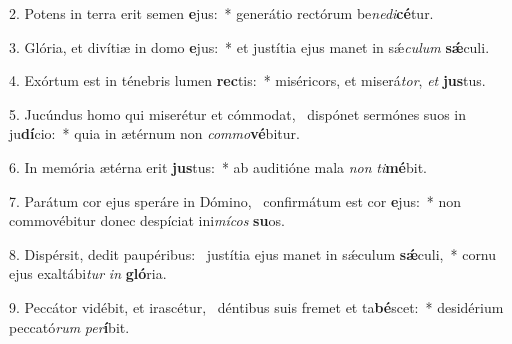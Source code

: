 2. Potens in terra erit semen \textbf{e}jus:~*  generátio rectórum be\textit{ne}\textit{di}\textbf{cé}tur.\

3. Glória, et divítiæ in domo \textbf{e}jus:~*  et justítia ejus manet in sǽ\textit{cu}\textit{lum} \textbf{sǽ}culi.\

4. Exórtum est in ténebris lumen \textbf{rec}tis:~*  miséricors, et miserá\textit{tor}, \textit{et} \textbf{jus}tus.\

5. Jucúndus homo qui miserétur et cómmodat, \dag\  dispónet sermónes suos in ju\textbf{dí}cio:~*  quia in ætérnum non \textit{com}\textit{mo}\textbf{vé}bitur.\

6. In memória ætérna erit \textbf{jus}tus:~*  ab auditióne mala \textit{non} \textit{ti}\textbf{mé}bit.\

7. Parátum cor ejus speráre in Dómino, \dag\  confirmátum est cor \textbf{e}jus:~*  non commovébitur donec despíciat ini\textit{mí}\textit{cos} \textbf{su}os.\

8. Dispérsit, dedit paupéribus: \dag\  justítia ejus manet in sǽculum \textbf{sǽ}culi,~*  cornu ejus exaltábi\textit{tur} \textit{in} \textbf{gló}ria.\

9. Peccátor vidébit, et irascétur, \dag\  déntibus suis fremet et ta\textbf{bé}scet:~*  desidérium peccató\textit{rum} \textit{per}\textbf{í}bit.\

